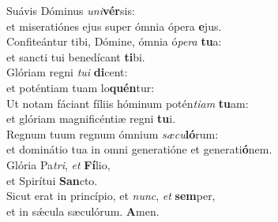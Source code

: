\evenverse Suávis Dóminus \textit{u}\textit{ni}\textbf{vér}sis:~\*\\
\evenverse et miseratiónes ejus super ómnia ópera \textbf{e}jus.\\
\oddverse Confiteántur tibi, Dómine, ómnia ó\textit{pe}\textit{ra} \textbf{tu}a:~\*\\
\oddverse et sancti tui benedícant \textbf{ti}bi.\\
\evenverse Glóriam regni \textit{tu}\textit{i} \textbf{di}cent:~\*\\
\evenverse et poténtiam tuam lo\textbf{quén}tur:\\
\oddverse Ut notam fáciant fíliis hóminum potén\textit{ti}\textit{am} \textbf{tu}am:~\*\\
\oddverse et glóriam magnificéntiæ regni \textbf{tu}i.\\
\evenverse Regnum tuum regnum ómnium \textit{sæ}\textit{cu}\textbf{ló}rum:~\*\\
\evenverse et dominátio tua in omni generatióne et generati\textbf{ó}nem.\\
\oddverse Glória Pa\textit{tri}, \textit{et} \textbf{Fí}lio,~\*\\
\oddverse et Spirítui \textbf{San}cto.\\
\evenverse Sicut erat in princípio, et \textit{nunc}, \textit{et} \textbf{sem}per,~\*\\
\evenverse et in sǽcula sæculórum. \textbf{A}men.\\
